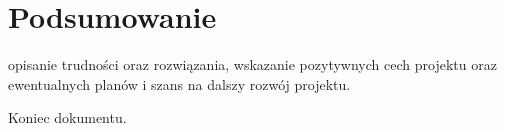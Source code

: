 \documentclass[10pt,a4paper]{article}
\begin{document}
\clearpage
\section{Podsumowanie}
opisanie trudności oraz rozwiązania, wskazanie pozytywnych cech projektu oraz ewentualnych planów i szans na dalszy rozwój projektu.


\noindent\makebox[\linewidth]{\rule{0.6\paperwidth}{0.4pt}}
\begin{center}
	Koniec dokumentu.
\end{center}
\end{document}
